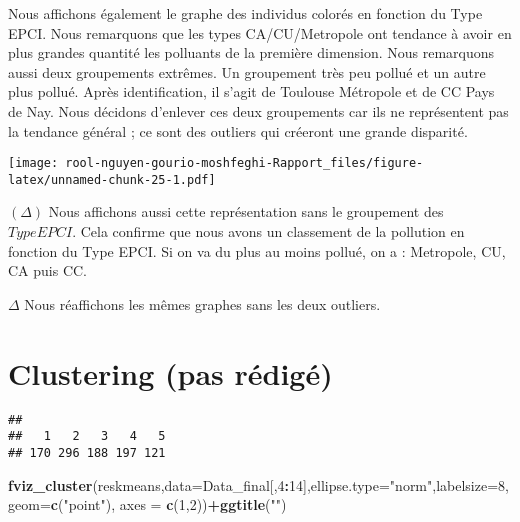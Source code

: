 \documentclass[
]{article}
\newenvironment{Shaded}{\begin{snugshade}}{\end{snugshade}}
\newcommand{\AttributeTok}[1]{\textcolor[rgb]{0.13,0.29,0.53}{#1}}
\newcommand{\DecValTok}[1]{\textcolor[rgb]{0.00,0.00,0.81}{#1}}
\newcommand{\FunctionTok}[1]{\textcolor[rgb]{0.13,0.29,0.53}{\textbf{#1}}}
\newcommand{\NormalTok}[1]{#1}
\newcommand{\OtherTok}[1]{\textcolor[rgb]{0.56,0.35,0.01}{#1}}
\newcommand{\SpecialCharTok}[1]{\textcolor[rgb]{0.81,0.36,0.00}{\textbf{#1}}}
\newcommand{\StringTok}[1]{\textcolor[rgb]{0.31,0.60,0.02}{#1}}
\begin{document}
Nous affichons également le graphe des individus colorés en fonction du
Type EPCI. Nous remarquons que les types CA/CU/Metropole ont tendance à
avoir en plus grandes quantité les polluants de la première dimension.
Nous remarquons aussi deux groupements extrêmes. Un groupement très peu
pollué et un autre plus pollué. Après identification, il s'agit de
Toulouse Métropole et de CC Pays de Nay. Nous décidons d'enlever ces
deux groupements car ils ne représentent pas la tendance général ; ce
sont des outliers qui créeront une grande disparité.

\texttt{[image: rool-nguyen-gourio-moshfeghi-Rapport\_files/figure-latex/unnamed-chunk-25-1.pdf]}

\((\Delta)\) Nous affichons aussi cette représentation sans le
groupement des \(TypeEPCI\). Cela confirme que nous avons un classement
de la pollution en fonction du Type EPCI. Si on va du plus au moins
pollué, on a : Metropole, CU, CA puis CC.

\(\Delta\) Nous réaffichons les mêmes graphes sans les deux outliers.

\hypertarget{clustering-pas-ruxe9diguxe9}{%
\section{Clustering (pas rédigé)}\label{clustering-pas-ruxe9diguxe9}}

\begin{Shaded}
\end{Shaded}

\begin{verbatim}
## 
##   1   2   3   4   5 
## 170 296 188 197 121
\end{verbatim}

\begin{Shaded}
\begin{Highlighting}[]
\FunctionTok{fviz\_cluster}\NormalTok{(reskmeans,}\AttributeTok{data=}\NormalTok{Data\_final[,}\DecValTok{4}\SpecialCharTok{:}\DecValTok{14}\NormalTok{],}\AttributeTok{ellipse.type=}\StringTok{"norm"}\NormalTok{,}\AttributeTok{labelsize=}\DecValTok{8}\NormalTok{,}\AttributeTok{geom=}\FunctionTok{c}\NormalTok{(}\StringTok{"point"}\NormalTok{), }\AttributeTok{axes =} \FunctionTok{c}\NormalTok{(}\DecValTok{1}\NormalTok{,}\DecValTok{2}\NormalTok{))}\SpecialCharTok{+}\FunctionTok{ggtitle}\NormalTok{(}\StringTok{""}\NormalTok{)}
\end{Highlighting}
\end{Shaded}
\end{document}
